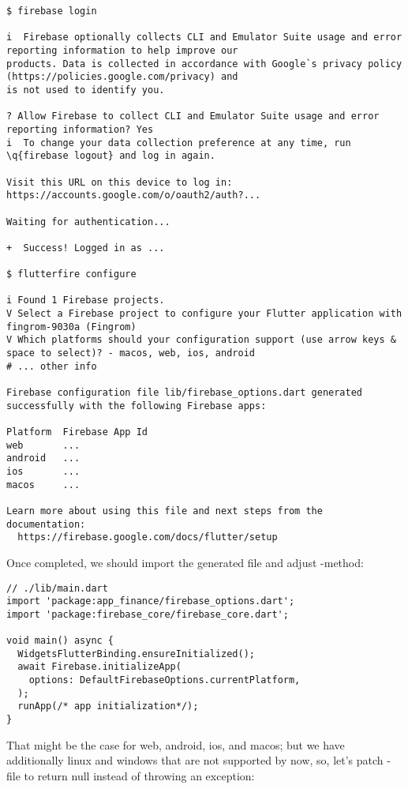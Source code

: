 \begin{lstlisting}[language=terminal]
$ firebase login

i  Firebase optionally collects CLI and Emulator Suite usage and error reporting information to help improve our 
products. Data is collected in accordance with Google`s privacy policy (https://policies.google.com/privacy) and 
is not used to identify you.

? Allow Firebase to collect CLI and Emulator Suite usage and error reporting information? Yes
i  To change your data collection preference at any time, run \q{firebase logout} and log in again.

Visit this URL on this device to log in:
https://accounts.google.com/o/oauth2/auth?...

Waiting for authentication...

+  Success! Logged in as ...

$ flutterfire configure

i Found 1 Firebase projects.
V Select a Firebase project to configure your Flutter application with  fingrom-9030a (Fingrom)
V Which platforms should your configuration support (use arrow keys & space to select)? - macos, web, ios, android
# ... other info

Firebase configuration file lib/firebase_options.dart generated successfully with the following Firebase apps:

Platform  Firebase App Id
web       ...
android   ...
ios       ...
macos     ...

Learn more about using this file and next steps from the documentation:
  https://firebase.google.com/docs/flutter/setup
\end{lstlisting}

\noindent Once completed, we should import the generated file and adjust -method:

\begin{lstlisting}
// ./lib/main.dart
import 'package:app_finance/firebase_options.dart';
import 'package:firebase_core/firebase_core.dart';

void main() async {
  WidgetsFlutterBinding.ensureInitialized();
  await Firebase.initializeApp(
    options: DefaultFirebaseOptions.currentPlatform,
  );
  runApp(/* app initialization*/);
}
\end{lstlisting}

\noindent That might be the case for web, android, ios, and macos; but we have additionally linux and windows that are 
not supported by now, so, let's patch -file to return null instead of throwing an exception:

